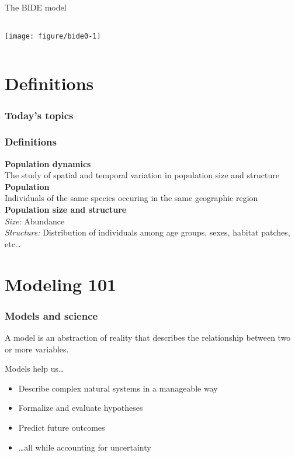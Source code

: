 \documentclass[color=usenames,dvipsnames]{beamer}\usepackage[]{graphicx}\usepackage[]{color}
\begin{document}
\begin{frame}
  \centering
    \huge
    The BIDE model \\
    \vfill

\begin{columns}
  \column{\dimexpr\paperwidth-10pt}
  \centering
  \texttt{[image: figure/bide0-1]} \\
\end{columns}
\end{frame}



\section{Definitions}


\begin{frame}
  \frametitle{Today's topics}
  \LARGE
\end{frame}


\begin{frame}
  \frametitle{Definitions}
  {\bf Population dynamics \\}
    The study of spatial and temporal variation in population size and structure
  \pause
  \vfill
  {\bf Population \\}
    Individuals of the same species occuring in the same geographic region
  \pause
  \vfill
  {\bf Population size and structure \\}
    {\color{Red}
      \it Size:} Abundance \\
    {\color{Red}
      \it Structure:} Distribution of individuals among age groups, sexes,
    habitat patches, etc\dots
\end{frame}



\section{Modeling 101}





\begin{frame}
  \frametitle{Models and science}
  \large
  A model is an abstraction of reality that describes the relationship between two or more variables. \par
  \pause
  \vfill
  {%
    Models help us\dots}
  \begin{itemize}[<+->]
    \item Describe complex natural systems in a manageable way
    \item Formalize and evaluate hypotheses
    \item Predict future outcomes
    \item \dots all while accounting for uncertainty
  \end{itemize}
\end{frame}
\end{document}
